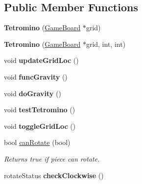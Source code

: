 \subsection*{Public Member Functions}
\begin{DoxyCompactItemize}
\item 
\hypertarget{class_tetromino_a1e693a4b99478302e7c7071667512e5f}{{\bfseries Tetromino} (\hyperlink{class_game_board}{Game\-Board} $\ast$grid)}\label{class_tetromino_a1e693a4b99478302e7c7071667512e5f}

\item 
\hypertarget{class_tetromino_a7be393128fb83186dbf63279f5200387}{{\bfseries Tetromino} (\hyperlink{class_game_board}{Game\-Board} $\ast$grid, int, int)}\label{class_tetromino_a7be393128fb83186dbf63279f5200387}

\item 
\hypertarget{class_tetromino_abe7074d0ac3811a17e567f1f810dcfef}{void {\bfseries update\-Grid\-Loc} ()}\label{class_tetromino_abe7074d0ac3811a17e567f1f810dcfef}

\item 
\hypertarget{class_tetromino_afca549c6385f4382e28597524672f30f}{void {\bfseries func\-Gravity} ()}\label{class_tetromino_afca549c6385f4382e28597524672f30f}

\item 
\hypertarget{class_tetromino_a209a18d5248708f8504c2c19cd3b96d8}{void {\bfseries do\-Gravity} ()}\label{class_tetromino_a209a18d5248708f8504c2c19cd3b96d8}

\item 
\hypertarget{class_tetromino_a7fad9884d40f29795f208546842d3188}{void {\bfseries test\-Tetromino} ()}\label{class_tetromino_a7fad9884d40f29795f208546842d3188}

\item 
\hypertarget{class_tetromino_a85b11b683ac5d714b613f540684a262a}{void {\bfseries toggle\-Grid\-Loc} ()}\label{class_tetromino_a85b11b683ac5d714b613f540684a262a}

\item 
bool \hyperlink{class_tetromino_a1fa856eee0e62418fdc430db4a1318ba}{can\-Rotate} (bool)
\begin{DoxyCompactList}\small\item\em Returns true if piece can rotate. \end{DoxyCompactList}\item 
\hypertarget{class_tetromino_a1d4927d722d5de5a8aac1de8d8a0e713}{rotate\-Status {\bfseries check\-Clockwise} ()}\label{class_tetromino_a1d4927d722d5de5a8aac1de8d8a0e713}


\end{DoxyCompactItemize}

